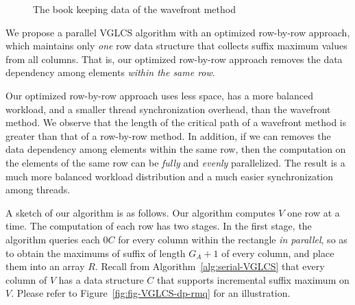 \begin{figure}[!thb]
  \centering {} 
  \caption{The book keeping data of the wavefront method}
  \label{fig:fig-VGLCS-dp-wavefront}
\end{figure}

We propose a parallel VGLCS algorithm with an optimized row-by-row
approach, which maintains only {\em one} row data structure that
collects suffix maximum values from all columns.  That is, our
optimized row-by-row approach removes the data dependency among
elements {\em within the same row}.

Our optimized row-by-row approach uses less space, has a more balanced
workload, and a smaller thread synchronization overhead, than the
wavefront method.  We observe that the length of the critical path of
a wavefront method is greater than that of a row-by-row method.  In
addition, if we can removes the data dependency among elements within
the same row, then the computation on the elements of the same row can
be {\em fully} and {\em evenly} parallelized.  The result is a much
more balanced workload distribution and a much easier synchronization
among threads.





A sketch of our algorithm is as follows.  Our algorithm computes $V$
one row at a time.  The computation of each row has two stages.  In
the first stage, the algorithm queries each 0$C$ for every column
within the rectangle {\em in parallel}, so as to obtain the maximums
of suffix of length $G_A + 1$ of every column, and place them into an
array $R$.  Recall from Algorithm~\ref{alg:serial-VGLCS} that every
column of $V$ has a data structure $C$ that supports incremental
suffix maximum on $V$.  Please refer to
Figure~\ref{fig:fig-VGLCS-dp-rmq} for an illustration.

